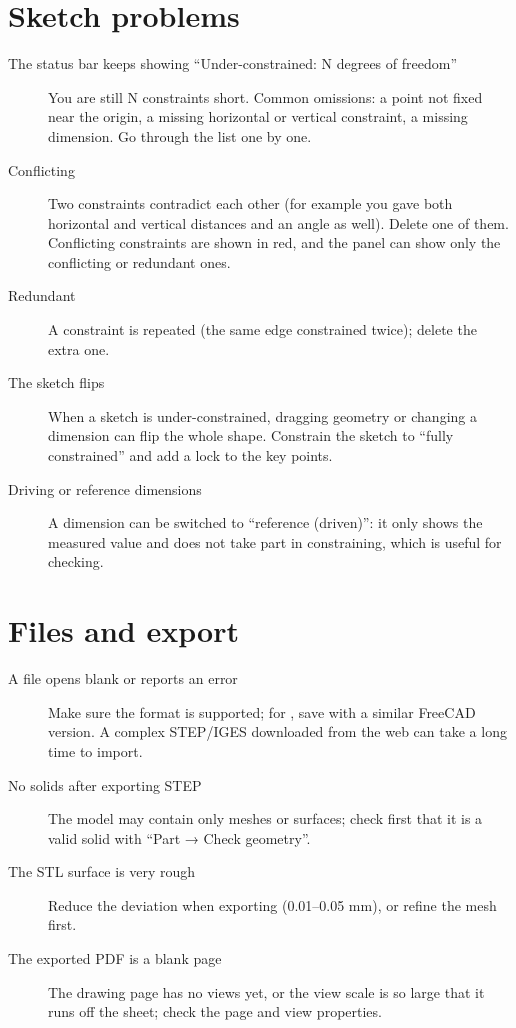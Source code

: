 \section{Sketch problems}

\begin{description}
  \item[The status bar keeps showing ``Under-constrained: N degrees of freedom''] You are still N constraints short.
        Common omissions: a point not fixed near the origin, a missing horizontal or vertical constraint, a missing dimension.
        Go through the  list one by one.
  \item[Conflicting] Two constraints contradict each other (for example you gave both horizontal and vertical distances
        and an angle as well). Delete one of them. Conflicting constraints are shown in red, and the 
        panel can show only the conflicting or redundant ones.
  \item[Redundant] A constraint is repeated (the same edge constrained twice); delete the extra one.
  \item[The sketch flips] When a sketch is under-constrained, dragging geometry or changing a dimension can flip the whole
        shape. Constrain the sketch to ``fully constrained'' and add a lock to the key points.
  \item[Driving or reference dimensions] A dimension can be switched to ``reference (driven)'': it only shows the measured
        value and does not take part in constraining, which is useful for checking.
\end{description}

\section{Files and export}

\begin{description}
  \item[A file opens blank or reports an error] Make sure the format is supported; for , save with a similar
        FreeCAD version. A complex STEP/IGES downloaded from the web can take a long time to import.
  \item[No solids after exporting STEP] The model may contain only meshes or surfaces; check first that it is a valid solid with ``Part → Check geometry''.
  \item[The STL surface is very rough] Reduce the deviation when exporting (0.01--0.05 mm), or refine the mesh first.
  \item[The exported PDF is a blank page] The drawing page has no views yet, or the view scale is so large that it runs off the sheet; check the page and view properties.
\end{description}

